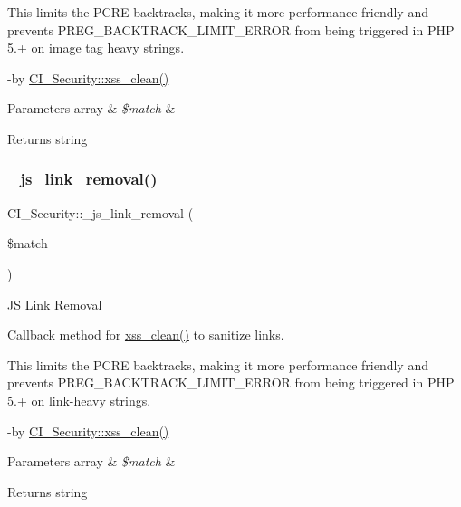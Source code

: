This limits the P\+C\+RE backtracks, making it more performance friendly and prevents P\+R\+E\+G\+\_\+\+B\+A\+C\+K\+T\+R\+A\+C\+K\+\_\+\+L\+I\+M\+I\+T\+\_\+\+E\+R\+R\+OR from being triggered in P\+HP 5.+ on image tag heavy strings.

-\/by \mbox{\hyperlink{class_c_i___security_a2a5bb2a641bd37cbae73a96ee35dee30}{C\+I\+\_\+\+Security\+::xss\+\_\+clean()}} 
\begin{DoxyParams}[1]{Parameters}
array & {\em \$match} & \\
\hline
\end{DoxyParams}
\begin{DoxyReturn}{Returns}
string 
\end{DoxyReturn}
\mbox{\label{class_c_i___security_a3e09d1f7fdc47de100df6e40fdb44b72}} 
\subsubsection{\texorpdfstring{\+\_\+js\+\_\+link\+\_\+removal()}{\_js\_link\_removal()}}
{\footnotesize\ttfamily C\+I\+\_\+\+Security\+::\+\_\+js\+\_\+link\+\_\+removal (\begin{DoxyParamCaption}\item[{}]{\$match }\end{DoxyParamCaption})\hspace{0.3cm}{\ttfamily [protected]}}

JS Link Removal

Callback method for \mbox{\hyperlink{class_c_i___security_a2a5bb2a641bd37cbae73a96ee35dee30}{xss\+\_\+clean()}} to sanitize links.

This limits the P\+C\+RE backtracks, making it more performance friendly and prevents P\+R\+E\+G\+\_\+\+B\+A\+C\+K\+T\+R\+A\+C\+K\+\_\+\+L\+I\+M\+I\+T\+\_\+\+E\+R\+R\+OR from being triggered in P\+HP 5.+ on link-\/heavy strings.

-\/by \mbox{\hyperlink{class_c_i___security_a2a5bb2a641bd37cbae73a96ee35dee30}{C\+I\+\_\+\+Security\+::xss\+\_\+clean()}} 
\begin{DoxyParams}[1]{Parameters}
array & {\em \$match} & \\
\hline
\end{DoxyParams}
\begin{DoxyReturn}{Returns}
string 
\end{DoxyReturn}
\mbox{\label{class_c_i___security_aebc54709b88db288c4bf6f4903511c22}} 
